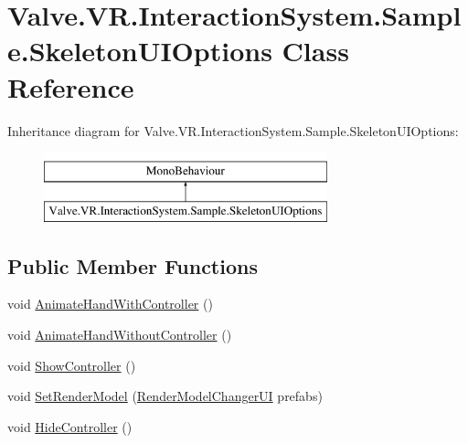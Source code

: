 \hypertarget{class_valve_1_1_v_r_1_1_interaction_system_1_1_sample_1_1_skeleton_u_i_options}{}\section{Valve.\+V\+R.\+Interaction\+System.\+Sample.\+Skeleton\+U\+I\+Options Class Reference}
\label{class_valve_1_1_v_r_1_1_interaction_system_1_1_sample_1_1_skeleton_u_i_options}
Inheritance diagram for Valve.\+V\+R.\+Interaction\+System.\+Sample.\+Skeleton\+U\+I\+Options\+:\begin{figure}[H]
\begin{center}
\leavevmode
\includegraphics[height=2.000000cm]{class_valve_1_1_v_r_1_1_interaction_system_1_1_sample_1_1_skeleton_u_i_options}
\end{center}
\end{figure}
\subsection*{Public Member Functions}
\begin{DoxyCompactItemize}
\item 
void \mbox{\hyperlink{class_valve_1_1_v_r_1_1_interaction_system_1_1_sample_1_1_skeleton_u_i_options_a380179bf86e7317e3af143de7aa094ea}{Animate\+Hand\+With\+Controller}} ()
\item 
void \mbox{\hyperlink{class_valve_1_1_v_r_1_1_interaction_system_1_1_sample_1_1_skeleton_u_i_options_a07b6f1b1749e6911b4c0b34366f65fc7}{Animate\+Hand\+Without\+Controller}} ()
\item 
void \mbox{\hyperlink{class_valve_1_1_v_r_1_1_interaction_system_1_1_sample_1_1_skeleton_u_i_options_a6d373a2d4fc1764ef4e7eaefa37f3388}{Show\+Controller}} ()
\item 
void \mbox{\hyperlink{class_valve_1_1_v_r_1_1_interaction_system_1_1_sample_1_1_skeleton_u_i_options_af9766d8646b845599ba60c781ae9b215}{Set\+Render\+Model}} (\mbox{\hyperlink{class_valve_1_1_v_r_1_1_interaction_system_1_1_sample_1_1_render_model_changer_u_i}{Render\+Model\+Changer\+UI}} prefabs)
\item 
void \mbox{\hyperlink{class_valve_1_1_v_r_1_1_interaction_system_1_1_sample_1_1_skeleton_u_i_options_ac32e9a7eea8d7808a3e4087f3e4e4898}{Hide\+Controller}} ()
\end{DoxyCompactItemize}


